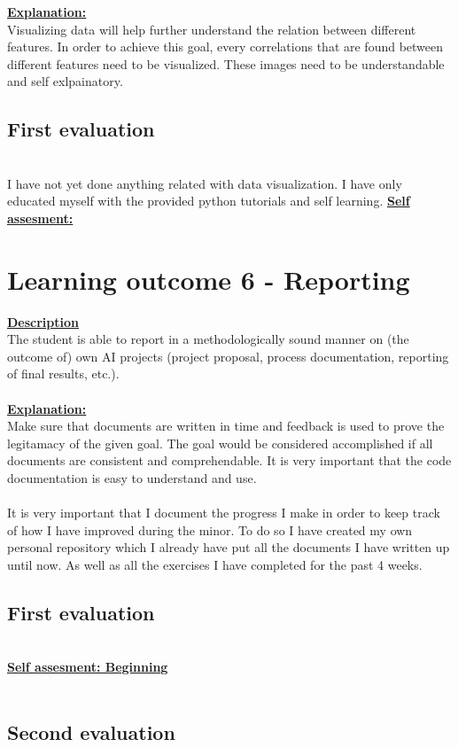 \documentclass{article}
\begin{document}
\underline{\textbf{Explanation:}}\\
Visualizing data will help further understand the relation between different features. In order to achieve this goal,
every correlations that are found between different features need to be visualized. These images need to be understandable and 
self exlpainatory.
\subsection{First evaluation}\\
I have not yet done anything related with data visualization. I have only educated myself with the provided python tutorials and self learning.
\underline{\textbf{Self assesment: }}
\section{Learning outcome 6 - Reporting}
\underline{\textbf{Description}}\\
The student is able to report in a methodologically sound manner on (the outcome of) 
own AI projects (project proposal, process documentation, reporting of final results, etc.).\\\\
\underline{\textbf{Explanation:}}\\
Make sure that documents are written in time and feedback is used to prove the legitamacy of the given goal. The goal would be considered 
accomplished if all documents are consistent and comprehendable. It is very important that the code documentation is easy
to understand and use.\\\\

It is very important that I document the progress I make in order to keep track of how I have improved during the minor. To do so 
I have created my own personal repository which I already have put all the documents I have written up until now. As well as all the exercises 
I have completed for the past 4 weeks. 
\subsection{First evaluation}\\
\underline{\textbf{Self assesment: Beginning}}\\\\
\subsection{Second evaluation}\\
\end{document}
